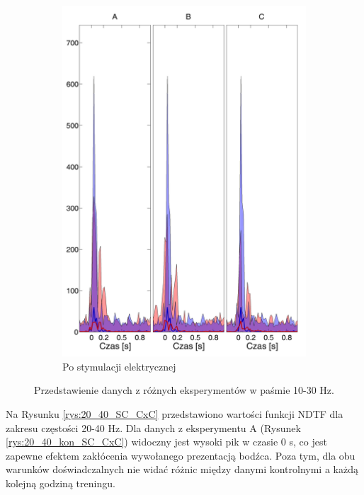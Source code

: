 \documentclass{pracamgr}
\begin{document}
\begin{figure}[h]
\begin{subfigure}{.5\textwidth}
			\includegraphics[width=1.\linewidth]{beta3_10-30_z_SC2_do_CxC82.png}
			\caption{Po stymulacji elektrycznej}
			\label{rys:10_30_beta_SC_CxC}
		\end{subfigure}
		\caption{Przedstawienie danych z różnych eksperymentów w paśmie 10-30 Hz.}
		\label{rys:10_30_SC_CxC}
	\end{figure}
	\FloatBarrier
	Na Rysunku \ref{rys:20_40_SC_CxC} przedstawiono wartości funkcji NDTF dla zakresu częstości 20-40 Hz. Dla danych z eksperymentu A (Rysunek \ref{rys:20_40_kon_SC_CxC}) widoczny jest wysoki pik w czasie 0 s, co jest zapewne efektem zakłócenia wywołanego prezentacją bodźca. Poza tym, dla obu warunków doświadczalnych nie widać różnic między danymi kontrolnymi a każdą kolejną godziną treningu.
\end{document}
